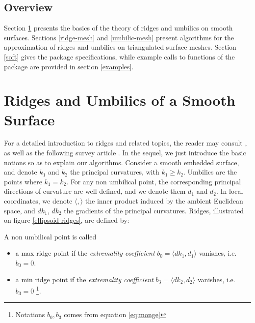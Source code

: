 \subsection{Overview}

Section \ref{smooth} presents the basics of the theory of ridges and
umbilics on smooth surfaces. Sections \ref{ridge-mesh} and
\ref{umbilic-mesh} present algorithms for the approximation of ridges and
umbilics on triangulated surface meshes. Section
\ref{soft} gives the package specifications, while example calls to
functions of the package are provided in section \ref{examples}.


\section{Ridges and Umbilics of a Smooth Surface}
\label{smooth}

For a detailed introduction to ridges and related topics, the reader
may consult 
\cite{cgal:hgygm-ttdpf-99,cgal:p-gd-01}, as well as
the following survey article \cite{cgal:cp-ssulc-05}.
In the sequel, we just introduce the basic notions so as to explain
our algorithms.  Consider a smooth embedded surface, and denote $k_1$
and $k_2$ the principal curvatures, with $k_1\geq k_2$. Umbilics are
the points where $k_1=k_2$.  For any non umbilical point, the
corresponding principal directions of curvature are well defined, and
we denote them $d_1$ and $d_2$.
In local coordinates, we denote $\langle , \rangle$ the inner product
induced by the ambient Euclidean space, and $dk_1$, $dk_2$ the
gradients of the principal curvatures. Ridges, illustrated on figure
\ref{ellipsoid-ridges}, are defined by:

\begin{definition}
\label{def:ridge-extrema}
A non umbilical point is called
\begin{itemize}
\item
a max ridge point if the {\em extremality coefficient} $b_0=\langle
dk_1,d_1 \rangle$ vanishes, i.e. $b_0=0$.

\item a min ridge point if the {\em extremality coefficient}
  $b_3=\langle dk_2,d_2 \rangle$ vanishes, i.e. $b_3=0$
  \footnote{Notations $b_0, b_3$ comes from equation \ref{eq:monge} }.
\end{itemize}
\end{definition}

